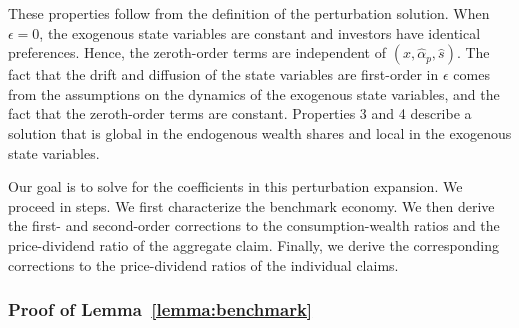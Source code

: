 \begin{lemma}
\begin{enumerate}
    \end{enumerate}
\end{lemma}

These properties follow from the definition of the perturbation solution.
When $\epsilon = 0$, the exogenous state variables are constant and investors have identical preferences.
Hence, the zeroth-order terms are independent of $(x,\hat{\alpha}_p,\hat{s})$.
The fact that the drift and diffusion of the state variables are first-order in $\epsilon$ comes from the assumptions on the dynamics of the exogenous state variables, and the fact that the zeroth-order terms are constant.
Properties 3 and 4 describe a solution that is global in the endogenous wealth shares and local in the exogenous state variables.

Our goal is to solve for the coefficients in this perturbation expansion.
We proceed in steps.
We first characterize the benchmark economy.
We then derive the first- and second-order corrections to the consumption-wealth ratios and the price-dividend ratio of the aggregate claim.
Finally, we derive the corresponding corrections to the price-dividend ratios of the individual claims.



\subsubsection{Proof of Lemma~\ref{lemma:benchmark}}\label{app:lemma1}

